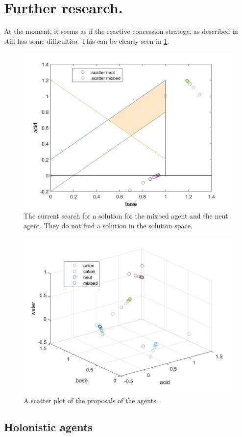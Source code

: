 \section{Further research.}
At the moment, it seems as if the reactive concession strategy, as described in \citet{zheng2015automated} still has some difficulties. This can be clearly seen in \cref{fig:solution-mixbed-neut}. 
\begin{figure}[h]
	\centering
	\includegraphics[width=0.7\linewidth]{"img/solution mixbed neut"}
	\caption{The current search for a solution for the mixbed agent and the neut agent. They do not find a solution in the solution space.}
	\label{fig:solution-mixbed-neut}
\end{figure}

\begin{figure}[h]
	\centering
	\includegraphics[width=0.7\linewidth]{img/scatter_of_proposals}
	\caption{A scatter plot of the proposals of the agents.}
	\label{fig:scatterofproposals}
\end{figure}


	

\subsection{Holonistic agents}

